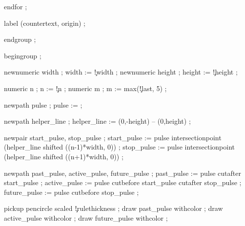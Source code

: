   endfor ;

  label (countertext, origin) ;

  endgroup ;

\stopuseMPgraphic





  begingroup ;

  newnumeric width  ; width  := \visualcounterparameter\c!width ;
  newnumeric height ; height := \visualcounterparameter\c!height ;

  numeric n ; n := \visualcounterparameter\c!n ;
  numeric m ; m := max(\visualcounterparameter\c!last, 5) ;


  newpath pulse ;
  pulse :=  ;

  newpath helper_line ;
  helper_line := (0,-height) -- (0,height) ;

  newpair start_pulse, stop_pulse ;
  start_pulse := pulse intersectionpoint (helper_line shifted ((n-1)*width, 0)) ;
  stop_pulse  := pulse intersectionpoint (helper_line shifted ((n+1)*width, 0)) ;

  
  newpath past_pulse, active_pulse, future_pulse ;
  past_pulse    := pulse cutafter start_pulse ;
  active_pulse  := pulse cutbefore start_pulse cutafter stop_pulse ;
  future_pulse  := pulse cutbefore stop_pulse ;

  pickup pencircle scaled \visualcounterparameter\c!rulethickness ;
  draw past_pulse   withcolor    ;
  draw active_pulse withcolor  ;
  draw future_pulse withcolor  ;

